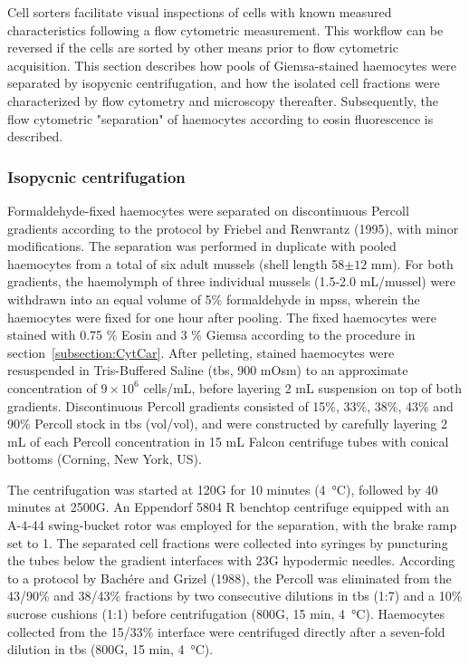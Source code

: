 Cell sorters facilitate visual inspections of cells with known measured characteristics following a flow cytometric measurement. This workflow can be reversed if the cells are sorted by other means prior to flow cytometric acquisition. This section describes how pools of Giemsa-stained haemocytes were separated by isopycnic centrifugation, and how the isolated cell fractions were characterized by flow cytometry and microscopy thereafter. Subsequently, the flow cytometric "separation" of haemocytes according to eosin fluorescence is described.

\subsubsection{Isopycnic centrifugation}
Formaldehyde-fixed haemocytes were separated on discontinuous Percoll gradients according to the protocol by Friebel and Renwrantz (1995), with minor modifications. The separation was performed in duplicate with pooled haemocytes from a total of six adult mussels (shell length 58$\pm{12}$ mm). For both gradients, the haemolymph of three individual mussels (1.5-2.0 mL/mussel) were withdrawn into an equal volume of 5\% formaldehyde in \acrshort{mpss}, wherein the haemocytes were fixed for one hour after pooling. The fixed haemocytes were stained with 0.75 \% Eosin and 3 \% Giemsa according to the procedure in section~\ref{subsection:CytCar}. After pelleting, stained haemocytes were resuspended in Tris-Buffered Saline (\acrshort{tbs}, 900 mOsm) to an approximate concentration of $9\times10^{6}$ cells/mL, before layering 2 mL suspension on top of both gradients. Discontinuous Percoll gradients consisted of 15\%, 33\%, 38\%, 43\% and 90\% Percoll stock in \acrshort{tbs} (vol/vol), and were constructed by carefully layering 2 mL of each Percoll concentration in 15 mL Falcon centrifuge tubes with conical bottoms (Corning, New York, US).

The centrifugation was started at 120G for 10 minutes (\SI{4}{\celsius}), followed by 40 minutes at 2500G. An Eppendorf 5804 R benchtop centrifuge equipped with an A-4-44 swing-bucket rotor was employed for the separation, with the brake ramp set to 1. The separated cell fractions were collected into syringes by puncturing the tubes below the gradient interfaces with 23G hypodermic needles. According to a protocol by Bachére and Grizel (1988), the Percoll was eliminated from the 43/90\% and 38/43\% fractions by two consecutive dilutions in \acrshort{tbs} (1:7) and a 10\% sucrose cushions (1:1) before centrifugation (800G, 15 min, \SI{4}{\celsius}). Haemocytes collected from the 15/33\% interface were centrifuged directly after a seven-fold dilution in \acrshort{tbs} (800G, 15 min, \SI{4}{\celsius}).

